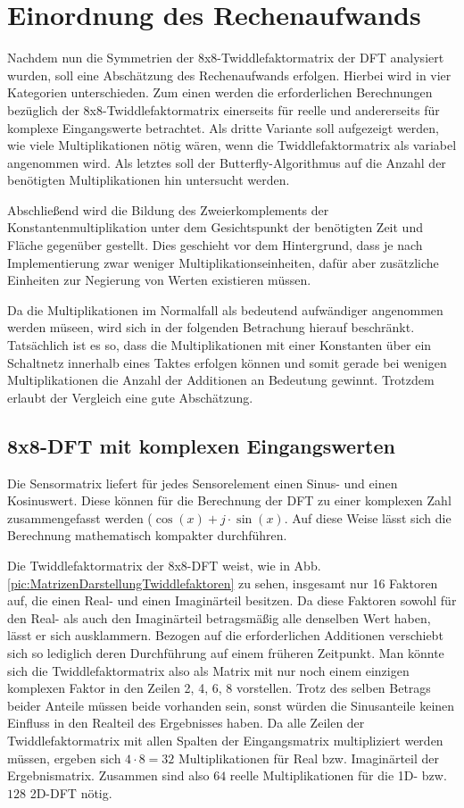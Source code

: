 \section{Einordnung des Rechenaufwands}\label{sec:abschaetzung_Rechenaufwand}
Nachdem nun die Symmetrien der 8x8-Twiddlefaktormatrix der DFT analysiert wurden, soll eine Abschätzung des Rechenaufwands erfolgen.
Hierbei wird in vier Kategorien unterschieden. Zum einen werden die erforderlichen Berechnungen bezüglich der 8x8-Twiddlefaktormatrix einerseits für reelle
und andererseits für komplexe Eingangswerte betrachtet. Als dritte Variante soll aufgezeigt werden, wie viele Multiplikationen nötig wären, wenn die 
Twiddlefaktormatrix als variabel angenommen wird. Als letztes soll der Butterfly-Algorithmus auf die Anzahl der benötigten Multiplikationen
hin untersucht werden.


Abschließend wird die Bildung des Zweierkomplements der Konstantenmultiplikation unter dem Gesichtspunkt der benötigten Zeit und Fläche gegenüber gestellt.
Dies geschieht vor dem Hintergrund, dass je nach Implementierung zwar weniger Multiplikationseinheiten, dafür aber zusätzliche Einheiten zur Negierung von Werten existieren müssen.

Da die Multiplikationen im Normalfall als bedeutend aufwändiger angenommen werden müseen, wird sich in der folgenden Betrachung hierauf beschränkt. Tatsächlich ist es so,
dass die Multiplikationen mit einer Konstanten über ein Schaltnetz innerhalb eines Taktes erfolgen können und somit gerade bei wenigen Multiplikationen die Anzahl der Additionen
an Bedeutung gewinnt. Trotzdem erlaubt der Vergleich eine gute Abschätzung.

\subsection{8x8-DFT mit komplexen Eingangswerten}\label{sec:KomplexeEingangswerte}
Die Sensormatrix liefert für jedes Sensorelement einen Sinus- und einen Kosinuswert. Diese können für die Berechnung der DFT zu einer komplexen Zahl zusammengefasst werden
($\cos(x)+j\cdot \sin(x)$. Auf diese Weise lässt sich die Berechnung mathematisch kompakter durchführen.

Die Twiddlefaktormatrix der 8x8-DFT weist, wie in Abb. \ref{pic:MatrizenDarstellungTwiddlefaktoren} zu sehen, insgesamt nur 16 Faktoren auf, die einen Real- und einen Imaginärteil 
besitzen. Da diese Faktoren sowohl für den Real- als auch den Imaginärteil betragsmäßig alle denselben Wert haben, lässt er sich ausklammern. Bezogen auf die erforderlichen 
Additionen verschiebt sich so lediglich deren Durchführung auf einem früheren Zeitpunkt. Man könnte sich die Twiddlefaktormatrix also als Matrix mit nur noch einem einzigen 
komplexen Faktor in den Zeilen 2, 4, 6, 8 vorstellen. Trotz des selben Betrags beider Anteile müssen beide vorhanden sein, sonst würden die Sinusanteile keinen Einfluss in
den Realteil des Ergebnisses haben. Da alle Zeilen der Twiddlefaktormatrix mit allen Spalten der Eingangsmatrix multipliziert werden müssen, ergeben sich $4\cdot8=32$ 
Multiplikationen für Real bzw. Imaginärteil der Ergebnismatrix. Zusammen sind also $64$ reelle Multiplikationen für die 1D- bzw. $128$ 2D-DFT nötig.


